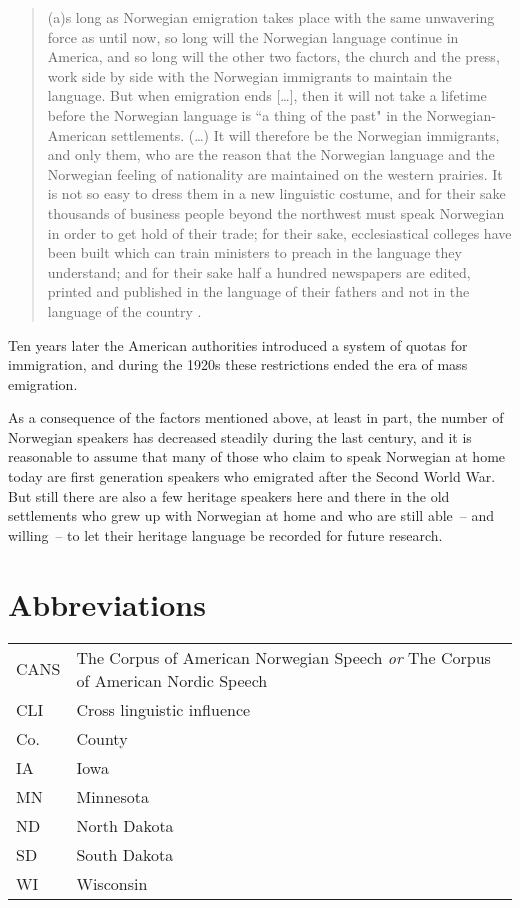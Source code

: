 \documentclass[output=paper]{langscibook}
\begin{document}
\begin{quote}
(a)s long as Norwegian emigration takes place with the same unwavering force as until now, so long will the Norwegian language continue in America, and so long will the other two factors, the church and the press, work side by side with the Norwegian immigrants to maintain the language. But when emigration ends […], then it will not take a lifetime before the Norwegian language is ``a thing of the past" in the Norwegian\hyp American settlements. (…) It will therefore be the Norwegian immigrants, and only them, who are the reason that the Norwegian language and the Norwegian feeling of nationality are maintained on the western prairies. It is not so easy to dress them in a new linguistic costume, and for their sake thousands of business people beyond the northwest must speak Norwegian in order to get hold of their trade; for their sake, ecclesiastical colleges have been built which can train ministers to preach in the language they understand; and for their sake half a hundred newspapers are edited, printed and published in the language of their fathers and not in the language of the country \citep[290, my translation]{Takla1913}. 
\end{quote}

Ten years later the American authorities introduced a system of quotas for immigration, and during the 1920s these restrictions ended the era of mass emigration. 

As a consequence of the factors mentioned above, at least in part, the number of Norwegian speakers has decreased steadily during the last century, and it is reasonable to assume that many of those who claim to speak Norwegian at home today are first generation speakers who emigrated after the Second World War. But still there are also a few heritage speakers here and there in the old settlements who grew up with Norwegian at home and who are still able~– and willing~– to let their heritage language be recorded for future research.

\section*{Abbreviations}
\begin{tabularx}{\textwidth}{@{}lQ@{}}
CANS &   The Corpus of American Norwegian Speech \textit{or} The Corpus of American Nordic Speech\\
CLI&   Cross linguistic influence\\
Co.&   County\\
IA & Iowa\\
MN & Minnesota\\
ND & North Dakota\\
SD & South Dakota\\
WI & Wisconsin\\
\end{tabularx}
\end{document}
